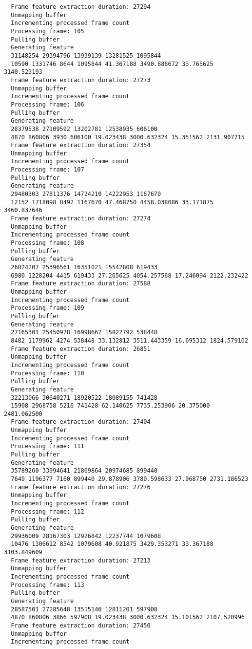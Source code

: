\documentclass[12pt,oneside]{book}
\begin{document}
\begin{lstlisting}
  Frame feature extraction duration: 27294
  Unmapping buffer
  Incrementing processed frame count
  Processing frame: 105
  Pulling buffer
  Generating feature
  31148254 29394796 13939139 13281525 1095844
  10590 1331746 8644 1095844 41.367188 3490.888672 33.765625 3140.523193
  Frame feature extraction duration: 27273
  Unmapping buffer
  Incrementing processed frame count
  Processing frame: 106
  Pulling buffer
  Generating feature
  28379538 27109592 13202781 12538935 606100
  4870 860806 3930 606100 19.023438 3000.632324 15.351562 2131.907715
  Frame feature extraction duration: 27354
  Unmapping buffer
  Incrementing processed frame count
  Processing frame: 107
  Pulling buffer
  Generating feature
  29480303 27811376 14724210 14222953 1167670
  12152 1718098 8492 1167670 47.468750 4458.038086 33.171875 3460.837646
  Frame feature extraction duration: 27274
  Unmapping buffer
  Incrementing processed frame count
  Processing frame: 108
  Pulling buffer
  Generating feature
  26824207 25396561 16351021 15542808 619433
  6980 1228204 4415 619433 27.265625 4054.257568 17.246094 2122.232422
  Frame feature extraction duration: 27588
  Unmapping buffer
  Incrementing processed frame count
  Processing frame: 109
  Pulling buffer
  Generating feature
  27165301 25450978 16998667 15822792 538448
  8482 1179962 4274 538448 33.132812 3511.443359 16.695312 1824.579102
  Frame feature extraction duration: 26851
  Unmapping buffer
  Incrementing processed frame count
  Processing frame: 110
  Pulling buffer
  Generating feature
  32213066 30640271 18920522 18089155 741428
  15908 2968758 5216 741428 62.140625 7735.253906 20.375000 2481.062500
  Frame feature extraction duration: 27404
  Unmapping buffer
  Incrementing processed frame count
  Processing frame: 111
  Pulling buffer
  Generating feature
  35789260 33994641 21869864 20974685 899440
  7649 1196377 7160 899440 29.878906 3780.598633 27.968750 2731.186523
  Frame feature extraction duration: 27276
  Unmapping buffer
  Incrementing processed frame count
  Processing frame: 112
  Pulling buffer
  Generating feature
  29936009 28167303 12926842 12237744 1079608
  10476 1306612 8542 1079608 40.921875 3429.353271 33.367188 3103.849609
  Frame feature extraction duration: 27213
  Unmapping buffer
  Incrementing processed frame count
  Processing frame: 113
  Pulling buffer
  Generating feature
  28587501 27285648 13515146 12811201 597908
  4870 860806 3866 597908 19.023438 3000.632324 15.101562 2107.520996
  Frame feature extraction duration: 27450
  Unmapping buffer
  Incrementing processed frame count

\end{lstlisting}
\end{document}

